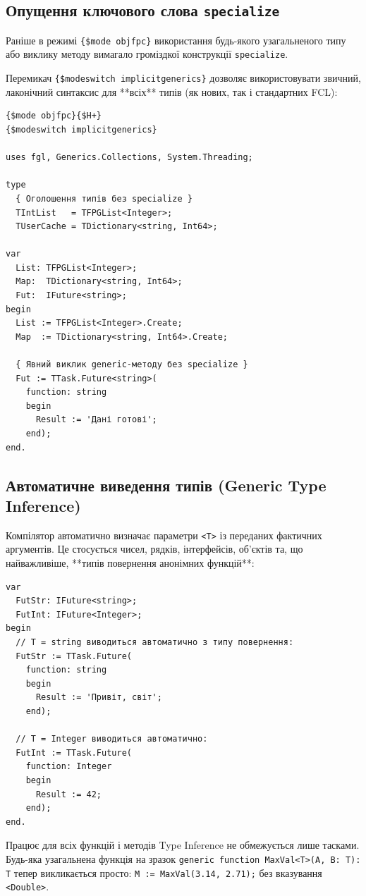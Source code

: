 \documentclass[11pt,a4paper]{article}
\begin{document}
\subsection{Опущення ключового слова \texttt{specialize}}
Раніше в режимі \texttt{\{\$mode objfpc\}} використання будь-якого узагальненого типу або виклику методу вимагало громіздкої конструкції \texttt{specialize}. 

Перемикач \texttt{\{\$modeswitch implicitgenerics\}} дозволяє використовувати звичний, лаконічний синтаксис для **всіх** типів (як нових, так і стандартних FCL):

\begin{lstlisting}
{$mode objfpc}{$H+}
{$modeswitch implicitgenerics}

uses fgl, Generics.Collections, System.Threading;

type
  { Оголошення типів без specialize }
  TIntList   = TFPGList<Integer>;
  TUserCache = TDictionary<string, Int64>;

var
  List: TFPGList<Integer>;
  Map:  TDictionary<string, Int64>;
  Fut:  IFuture<string>;
begin
  List := TFPGList<Integer>.Create;
  Map  := TDictionary<string, Int64>.Create;
  
  { Явний виклик generic-методу без specialize }
  Fut := TTask.Future<string>(
    function: string
    begin
      Result := 'Дані готові';
    end);
end.
\end{lstlisting}

\subsection{Автоматичне виведення типів (Generic Type Inference)}
Компілятор автоматично визначає параметри \texttt{<T>} із переданих фактичних аргументів. Це стосується чисел, рядків, інтерфейсів, об'єктів та, що найважливіше, **типів повернення анонімних функцій**:

\begin{lstlisting}
var
  FutStr: IFuture<string>;
  FutInt: IFuture<Integer>;
begin
  // T = string виводиться автоматично з типу повернення:
  FutStr := TTask.Future(
    function: string
    begin
      Result := 'Привіт, світ';
    end);

  // T = Integer виводиться автоматично:
  FutInt := TTask.Future(
    function: Integer
    begin
      Result := 42;
    end);
end.
\end{lstlisting}

\begin{tipbox}{Працює для всіх функцій і методів}
Type Inference не обмежується лише тасками. Будь-яка узагальнена функція на зразок \texttt{generic function MaxVal<T>(A, B: T): T} тепер викликається просто: \texttt{M := MaxVal(3.14, 2.71);} без вказування \texttt{<Double>}.
\end{tipbox}
\end{document}
